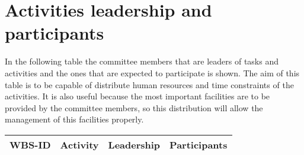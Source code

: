 \section{Activities leadership and participants}
In the following table the committee members that are leaders of tasks and activities and the ones that are expected to participate is shown. The aim of this table is to be capable of distribute human resources and time constraints of the activities. It is also useful because the most important facilities are to be provided by the committee members, so this distribution will allow the management of this facilities properly. 

\begin{longtable}[H]{l p{4cm} p{4cm} p{4cm}}
	\toprule[2pt]
	\textbf{WBS-ID} &  \textbf{Activity}  & \textbf{Leadership} & \textbf{Participants} \\ 
	\midrule [1.5pt]
	\endhead
	

\end{longtable}

